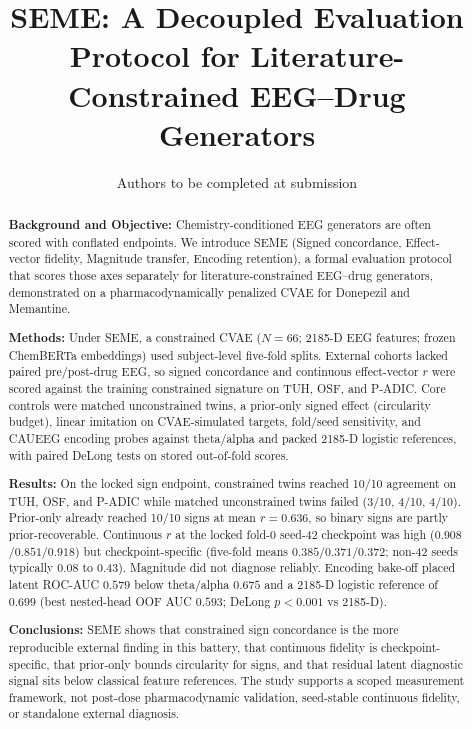 \documentclass[preprint,12pt,3p,times]{elsarticle}
\begin{document}
\begin{frontmatter}

\title{SEME: A Decoupled Evaluation Protocol for
Literature-Constrained EEG--Drug Generators}

\author{Authors to be completed at submission}

\begin{abstract}
\noindent\textbf{Background and Objective:} Chemistry-conditioned EEG generators are often scored with conflated endpoints. We introduce SEME (Signed concordance, Effect-vector fidelity, Magnitude transfer, Encoding retention), a formal evaluation protocol that scores those axes separately for literature-constrained EEG--drug generators, demonstrated on a pharmacodynamically penalized CVAE for Donepezil and Memantine.

\noindent\textbf{Methods:} Under SEME, a constrained CVAE ($N{=}66$; 2185-D EEG features; frozen ChemBERTa embeddings) used subject-level five-fold splits. External cohorts lacked paired pre/post-drug EEG, so signed concordance and continuous effect-vector $r$ were scored against the training constrained signature on TUH, OSF, and P-ADIC. Core controls were matched unconstrained twins, a prior-only signed effect (circularity budget), linear imitation on CVAE-simulated targets, fold/seed sensitivity, and CAUEEG encoding probes against theta/alpha and packed 2185-D logistic references, with paired DeLong tests on stored out-of-fold scores.

\noindent\textbf{Results:} On the locked sign endpoint, constrained twins reached 10/10 agreement on TUH, OSF, and P-ADIC while matched unconstrained twins failed (3/10, 4/10, 4/10). Prior-only already reached 10/10 signs at mean $r{=}0.636$, so binary signs are partly prior-recoverable. Continuous $r$ at the locked fold-0 seed-42 checkpoint was high ($0.908$/$0.851$/$0.918$) but checkpoint-specific (five-fold means $0.385$/$0.371$/$0.372$; non-42 seeds typically 0.08 to 0.43). Magnitude did not diagnose reliably. Encoding bake-off placed latent ROC-AUC $0.579$ below theta/alpha $0.675$ and a 2185-D logistic reference of $0.699$ (best nested-head OOF AUC $0.593$; DeLong $p{<}0.001$ vs 2185-D).

\noindent\textbf{Conclusions:} SEME shows that constrained sign concordance is the more reproducible external finding in this battery, that continuous fidelity is checkpoint-specific, that prior-only bounds circularity for signs, and that residual latent diagnostic signal sits below classical feature references. The study supports a scoped measurement framework, not post-dose pharmacodynamic validation, seed-stable continuous fidelity, or standalone external diagnosis.
\end{abstract}


\end{frontmatter}
\end{document}

